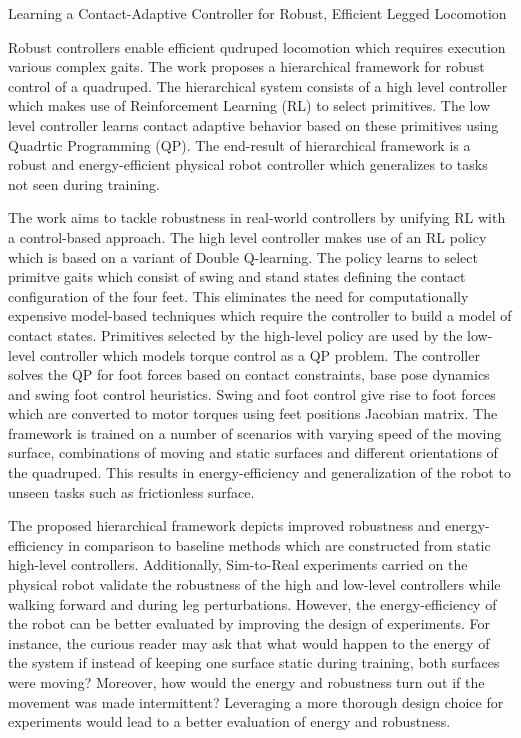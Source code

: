 \documentclass[11pt,letterpaper]{article}
\begin{document}
\begin{center}
  \large{Learning a Contact-Adaptive Controller for Robust,
  Efficient Legged Locomotion}
\end{center}

Robust controllers enable efficient qudruped locomotion which requires execution various complex gaits. The work proposes a hierarchical framework for robust control of a quadruped. The hierarchical system consists of a high level controller which makes use of Reinforcement Learning (RL) to select primitives. The low level controller learns contact adaptive behavior based on these primitives using Quadrtic Programming (QP). The end-result of hierarchical framework is a robust and energy-efficient physical robot controller which generalizes to tasks not seen during training.  

The work aims to tackle robustness in real-world controllers by unifying RL with a control-based approach. The high level controller makes use of an RL policy which is based on a variant of Double Q-learning. The policy learns to select primitve gaits which consist of swing and stand states defining the contact configuration of the four feet. This eliminates the need for computationally expensive model-based techniques which require the controller to build a model of contact states. Primitives selected by the high-level policy are used by the low-level controller which models torque control as a QP problem. The controller solves the QP for foot forces based on contact constraints, base pose dynamics and swing foot control heuristics. Swing and foot control give rise to foot forces which are converted to motor torques using feet positions Jacobian matrix. The framework is trained on a number of scenarios with varying speed of the moving surface, combinations of moving and static surfaces and different orientations of the quadruped. This results in energy-efficiency and generalization of the robot to unseen tasks such as frictionless surface.

The proposed hierarchical framework depicts improved robustness and energy-efficiency in comparison to baseline methods which are constructed from static high-level controllers. Additionally, Sim-to-Real experiments carried on the physical robot validate the robustness of the high and low-level controllers while walking forward and during leg perturbations. However, the energy-efficiency of the robot can be better evaluated by improving the design of experiments. For instance, the curious reader may ask that what would happen to the energy of the system if instead of keeping one surface static during training, both surfaces were moving? Moreover, how would the energy and robustness turn out if the movement was made intermittent? Leveraging a more thorough design choice for experiments would lead to a better evaluation of energy and robustness. 
\end{document}

